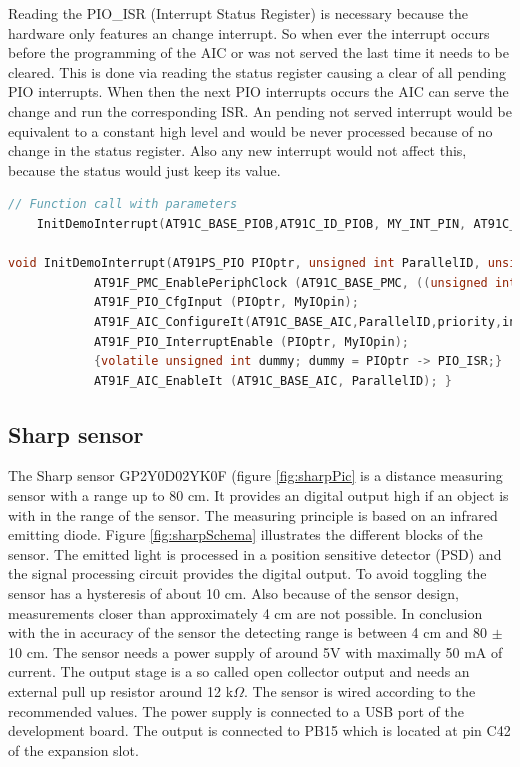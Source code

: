 Reading the \ac{PIO}\_ISR (Interrupt Status Register) is necessary because the hardware only features an change interrupt. So when ever the interrupt occurs before the programming of the \ac{AIC} or was not served the last time it needs to be cleared. This is done via reading the status register causing a clear of all pending \ac{PIO} interrupts. When then the next \ac{PIO} interrupts occurs the \ac{AIC} can serve the change and run the corresponding \ac{ISR}. An pending not served interrupt would be equivalent to a constant high level and would be never processed because of no change in the status register. Also any new interrupt would not affect this, because the status would just keep its value.\cite{AT91PIO}\\




\begin{lstlisting}[language=C, caption={Demo interrupt at PB15 configured as rising}, label={IOCFG}]
// Function call with parameters
	InitDemoInterrupt(AT91C_BASE_PIOB,AT91C_ID_PIOB, MY_INT_PIN, AT91C_AIC_PRIOR_LOWEST, AT91C_AIC_SRCTYPE_EXT_POSITIVE_EDGE);

void InitDemoInterrupt(AT91PS_PIO PIOptr, unsigned int ParallelID, unsigned int MyIOpin, unsigned int priority, unsigned int intType){
			AT91F_PMC_EnablePeriphClock (AT91C_BASE_PMC, ((unsigned int) 1 << ParallelID));
			AT91F_PIO_CfgInput (PIOptr, MyIOpin); 
			AT91F_AIC_ConfigureIt(AT91C_BASE_AIC,ParallelID,priority,intType,Measured_Interrupt_Lowlevel);
			AT91F_PIO_InterruptEnable (PIOptr, MyIOpin);
			{volatile unsigned int dummy; dummy = PIOptr -> PIO_ISR;}
			AT91F_AIC_EnableIt (AT91C_BASE_AIC, ParallelID); }
\end{lstlisting}

\subsection{Sharp sensor}
\label{UVsens}
The Sharp sensor GP2Y0D02YK0F (figure \ref{fig:sharpPic} is a distance measuring sensor with a range up to 80 cm. It provides an digital output high if an object is with in the range of the sensor. The measuring principle is based on an infrared emitting diode. Figure \ref{fig:sharpSchema} illustrates the different blocks of the sensor. The emitted light is processed in a position sensitive detector (PSD) and the signal processing circuit provides the digital output. To avoid toggling the sensor has a hysteresis of about 10 cm. Also because of the sensor design, measurements closer than approximately 4 cm are not possible. In conclusion with the in accuracy of the sensor the detecting range is between 4 cm and 80 $\pm$ 10 cm. The sensor needs a power supply of around 5V with maximally 50 mA of current. The output stage is a so called open collector output and needs an external pull up resistor around 12 k$\Omega$. The sensor is wired according to the recommended values. The power supply is connected to a \ac{USB} port of the development board. The output is connected to PB15 which is located at pin C42 of the expansion slot.\cite{sharp}\\

